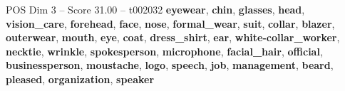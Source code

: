 \begin{textsample}{POS Dim 3 – Score 31.00 – t002032}  \label{ex:f3_pos_027}
\textbf{eyewear}, \textbf{chin}, \textbf{glasses}, \textbf{head}, \textbf{vision\_care}, \textbf{forehead}, \textbf{face}, \textbf{nose}, \textbf{formal\_wear}, \textbf{suit}, \textbf{collar}, \textbf{blazer}, \textbf{outerwear}, \textbf{mouth}, \textbf{eye}, \textbf{coat}, \textbf{dress\_shirt}, \textbf{ear}, \textbf{white-collar\_worker}, \textbf{necktie}, \textbf{wrinkle}, \textbf{spokesperson}, \textbf{microphone}, \textbf{facial\_hair}, \textbf{official}, \textbf{businessperson}, \textbf{moustache}, \textbf{logo}, \textbf{speech}, \textbf{job}, \textbf{management}, \textbf{beard}, \textbf{pleased}, \textbf{organization}, \textbf{speaker}

\end{textsample}
